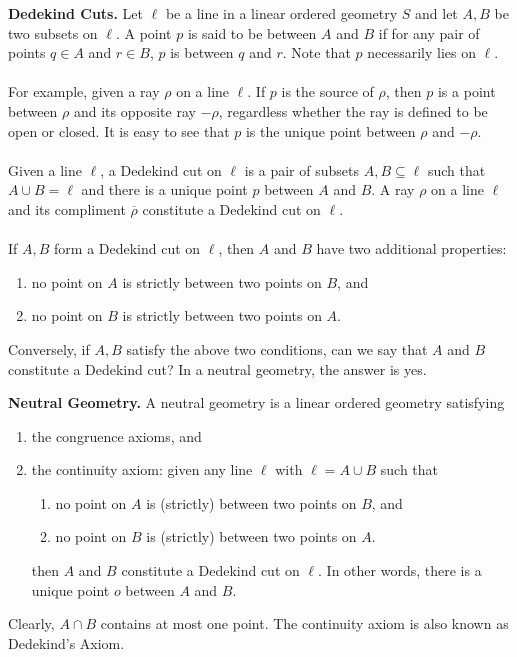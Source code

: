 \documentclass[12pt]{article}
\begin{document}
\textbf{Dedekind Cuts.}  Let $\ell$ be a line in a linear ordered
geometry $S$ and let $A,B$ be two subsets on $\ell$.  A point $p$ is
said to be between $A$ and $B$ if for any pair of points $q\in A$
and $r\in B$, $p$ is between $q$ and $r$.  Note that $p$ necessarily
lies on $\ell$.
\\\\
For example, given a ray $\rho$ on a line $\ell$.  If $p$ is the
source of $\rho$, then $p$ is a point between $\rho$ and its
opposite ray $-\rho$, regardless whether the ray is defined to be
open or closed.  It is easy to see that $p$ is the unique point
between $\rho$ and $-\rho$.
\\\\
Given a line $\ell$, a Dedekind cut on $\ell$ is a pair of subsets
$A,B\subseteq\ell$ such that $A\cup B=\ell$ and there is a unique
point $p$ between $A$ and $B$.  A ray $\rho$ on a line $\ell$ and
its compliment $\overline{\rho}$ constitute a Dedekind cut on
$\ell$.
\\\\
If $A,B$ form a Dedekind cut on $\ell$, then $A$ and $B$ have two additional properties:
\begin{enumerate}
\item no point on $A$ is strictly between two points on $B$, and
\item no point on $B$ is strictly between two points on $A$.
\end{enumerate}

Conversely, if $A,B$ satisfy the above two conditions, can we say that $A$ and $B$ constitute a Dedekind cut?  In a neutral geometry, the answer is yes.

\textbf{Neutral Geometry.} A neutral geometry is a linear ordered
geometry satisfying
\begin{enumerate}
\item the congruence axioms, and
\item the continuity axiom:
given any line $\ell$ with $\ell=A\cup B$ such that
\begin{enumerate}
\item no point on $A$ is (strictly) between two points on $B$, and
\item no point on $B$ is (strictly) between two points on $A$.
\end{enumerate}
then $A$ and $B$ constitute a Dedekind cut on $\ell$.  In other
words, there is a unique point $o$ between $A$ and $B$.
\end{enumerate}
Clearly,
$A\cap B$ contains at most one point.  The continuity axiom is also known as Dedekind's Axiom.
\end{document}
